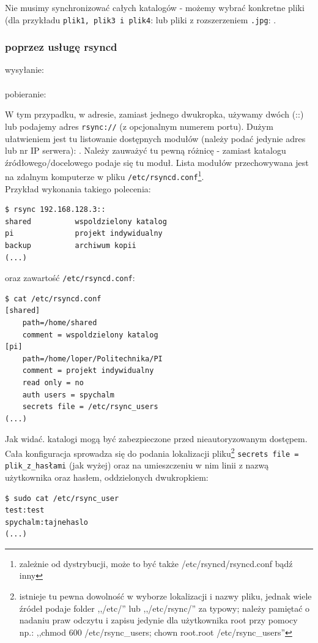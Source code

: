 Nie musimy synchronizować całych katalogów - możemy wybrać konkretne pliki (dla przykładu \verb|plik1, plik3 i plik4|:  lub pliki z rozszerzeniem \verb|.jpg|: .

\subsubsection{poprzez usługę rsyncd}
\label{demon}
\begin{center}
wysyłanie:
 \\
 \\
pobieranie:
 \\
\end{center}

W tym przypadku, w adresie, zamiast jednego dwukropka, używamy dwóch (::) lub podajemy adres \verb|rsync://| (z opcjonalnym numerem portu). Dużym ułatwieniem jest tu listowanie dostępnych modułów (należy podać jedynie adres lub nr IP serwera): . Należy zauważyć tu pewną różnicę - zamiast katalogu źródłowego/docelowego podaje się tu moduł. Lista modułów przechowywana jest na zdalnym komputerze w pliku \verb|/etc/rsyncd.conf|\footnote{zależnie od dystrybucji, może to być także /etc/rsyncd/rsyncd.conf bądź inny}.\\
Przykład wykonania takiego polecenia:
\begin{verbatim}
$ rsync 192.168.128.3::
shared          wspoldzielony katalog
pi              projekt indywidualny
backup          archiwum kopii
(...)
\end{verbatim}
oraz zawartość \verb|/etc/rsyncd.conf|:
\begin{verbatim}
$ cat /etc/rsyncd.conf
[shared]
    path=/home/shared
    comment = wspoldzielony katalog
[pi]
    path=/home/loper/Politechnika/PI
    comment = projekt indywidualny
    read only = no
    auth users = spychalm
    secrets file = /etc/rsync_users
(...)
\end{verbatim}
Jak widać. katalogi mogą być zabezpieczone przed nieautoryzowanym dostępem. Cała konfiguracja sprowadza się do podania lokalizacji pliku\footnote{istnieje tu pewna dowolność w wyborze lokalizacji i nazwy pliku, jednak wiele źródeł podaje folder ,,/etc/'' lub ,,/etc/rsync/'' za typowy; należy pamiętać o nadaniu praw odczytu i zapisu jedynie dla użytkownika root przy pomocy np.: ,,chmod 600 /etc/rsync\_users; chown root.root /etc/rsync\_users''} \verb|secrets file = plik_z_hasłami| (jak wyżej) oraz na umieszczeniu w nim linii z nazwą użytkownika oraz hasłem, oddzielonych dwukropkiem: 
\begin{verbatim}
$ sudo cat /etc/rsync_user
test:test
spychalm:tajnehaslo
(...)
\end{verbatim}

